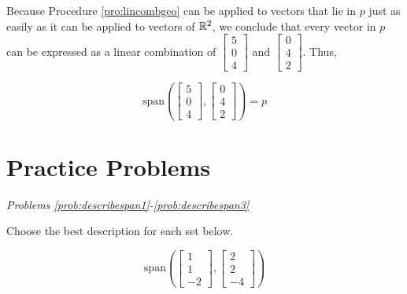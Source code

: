 \documentclass{ximera}
\begin{document}
\begin{example}
\begin{explanation}
Because Procedure \ref{pro:lincombgeo} can be applied to vectors that lie in $p$ just as easily as it can be applied to vectors of $\mathbb{R}^2$, we conclude that every vector in $p$ can be expressed as a linear combination of $\begin{bmatrix}5\\0\\4\end{bmatrix}$ and  $\begin{bmatrix}0\\4\\2\end{bmatrix}$.  Thus, 

$$\mbox{span}\left(\begin{bmatrix}5\\0\\4\end{bmatrix}, \begin{bmatrix}0\\4\\2\end{bmatrix}\right)=p$$

\end{explanation}
\end{example}

\section*{Practice Problems}

\emph{Problems \ref{prob:describespan1}-\ref{prob:describespan3}}

Choose the best description for each set below.

  \begin{problem}\label{prob:describespan1}
  $$\mbox{span}\left(\begin{bmatrix}1\\1\\-2\end{bmatrix}, \begin{bmatrix}2\\2\\-4\end{bmatrix}\right)$$
  
  \begin{multipleChoice}
 \end{multipleChoice}
  \end{problem}
  
\end{document}
